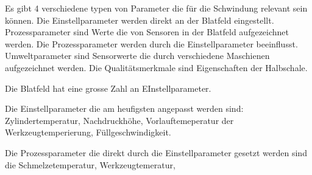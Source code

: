Es gibt 4 verschiedene typen von Parameter die für die Schwindung relevant sein können. Die Einstellparameter werden direkt an der Blatfeld eingestellt.
Prozessparameter sind Werte die von Sensoren in der Blatfeld aufgezeichnet werden. Die Prozessparameter werden durch die Einstellparameter beeinflusst. Umweltparameter sind Sensorwerte die durch verschiedene Maschienen aufgezeichnet werden. Die Qualitätsmerkmale sind Eigenschaften der Halbschale.



Die Blatfeld hat eine grosse Zahl an EInstellparameter.

Die Einstellparameter die am heufigsten angepasst werden sind: Zylindertemperatur, Nachdruckhöhe, Vorlauftemeperatur der Werkzeugtemperierung, Füllgeschwindigkeit.

Die Prozessparameter die direkt durch die Einstellparameter gesetzt werden sind die Schmelzetemperatur, Werkzeugtemeratur,
